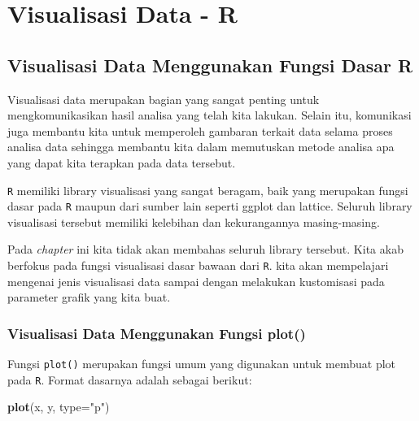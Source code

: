 \documentclass[]{book}
\newenvironment{Shaded}{\begin{snugshade}}{\end{snugshade}}
\newcommand{\KeywordTok}[1]{\textcolor[rgb]{0.13,0.29,0.53}{\textbf{#1}}}
\newcommand{\DataTypeTok}[1]{\textcolor[rgb]{0.13,0.29,0.53}{#1}}
\newcommand{\StringTok}[1]{\textcolor[rgb]{0.31,0.60,0.02}{#1}}
\newcommand{\NormalTok}[1]{#1}
\begin{document}
\part*{Visualisasi Data - R}\label{part-visualisasi-data---r}

\chapter{Visualisasi Data Menggunakan Fungsi Dasar
R}\label{visualisasi-data-menggunakan-fungsi-dasar-r}

Visualisasi data merupakan bagian yang sangat penting untuk
mengkomunikasikan hasil analisa yang telah kita lakukan. Selain itu,
komunikasi juga membantu kita untuk memperoleh gambaran terkait data
selama proses analisa data sehingga membantu kita dalam memutuskan
metode analisa apa yang dapat kita terapkan pada data tersebut.

\texttt{R} memiliki library visualisasi yang sangat beragam, baik yang
merupakan fungsi dasar pada \texttt{R} maupun dari sumber lain seperti
ggplot dan lattice. Seluruh library visualisasi tersebut memiliki
kelebihan dan kekurangannya masing-masing.

Pada \emph{chapter} ini kita tidak akan membahas seluruh library
tersebut. Kita akab berfokus pada fungsi visualisasi dasar bawaan dari
\texttt{R}. kita akan mempelajari mengenai jenis visualisasi data sampai
dengan melakukan kustomisasi pada parameter grafik yang kita buat.

\section{Visualisasi Data Menggunakan Fungsi
plot()}\label{visualisasi-data-menggunakan-fungsi-plot}

Fungsi \texttt{plot()} merupakan fungsi umum yang digunakan untuk
membuat plot pada \texttt{R}. Format dasarnya adalah sebagai berikut:

\begin{Shaded}
\begin{Highlighting}[]
\KeywordTok{plot}\NormalTok{(x, y, }\DataTypeTok{type=}\StringTok{"p"}\NormalTok{)}
\end{Highlighting}
\end{Shaded}
\end{document}

